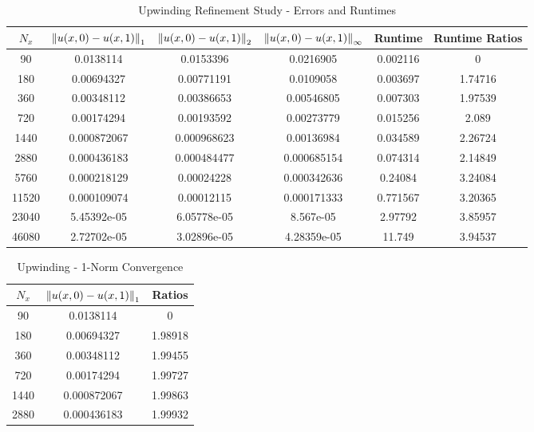 \documentclass[12pt]{article}
\begin{document}
\begin{enumerate}[(a)]
\begin{table}[H]
\caption{Upwinding Refinement Study - Errors and Runtimes}
\centering\begin{tabular}{||c|ccc|cc||}
\hline \hline
    $N_x$ & $\norm{u(x,0)-u(x,1)}_1$ & $\norm{u(x,0)-u(x,1)}_2$ & $\norm{u(x,0)-u(x,1)}_{\infty}$ &   Runtime &   Runtime Ratios \\
\hline
    90 &    0.0138114   &    0.0153396   &      0.0216905   &  0.002116 &          0       \\
   180 &    0.00694327  &    0.00771191  &      0.0109058   &  0.003697 &          1.74716 \\
   360 &    0.00348112  &    0.00386653  &      0.00546805  &  0.007303 &          1.97539 \\
   720 &    0.00174294  &    0.00193592  &      0.00273779  &  0.015256 &          2.089   \\
  1440 &    0.000872067 &    0.000968623 &      0.00136984  &  0.034589 &          2.26724 \\
  2880 &    0.000436183 &    0.000484477 &      0.000685154 &  0.074314 &          2.14849 \\
  5760 &    0.000218129 &    0.00024228  &      0.000342636 &  0.24084  &          3.24084 \\
 11520 &    0.000109074 &    0.00012115  &      0.000171333 &  0.771567 &          3.20365 \\
 23040 &    5.45392e-05 &    6.05778e-05 &      8.567e-05   &  2.97792  &          3.85957 \\
 46080 &    2.72702e-05 &    3.02896e-05 &      4.28359e-05 & 11.749    &          3.94537 \\
\hline \hline
\end{tabular}
\end{table}
\begin{minipage}{0.5\textwidth}
\begin{table}[H]
\caption{Upwinding - 1-Norm Convergence}
\centering\begin{tabular}{||c|cc||}
\hline \hline
    $N_x$ &   $\norm{u(x,0)-u(x,1)}_1$ &   Ratios \\
\hline
    90 &    0.0138114   &  0       \\
   180 &    0.00694327  &  1.98918 \\
   360 &    0.00348112  &  1.99455 \\
   720 &    0.00174294  &  1.99727 \\
  1440 &    0.000872067 &  1.99863 \\
  2880 &    0.000436183 &  1.99932 \\

\end{tabular}
\end{table}
\end{minipage}
\end{enumerate}
\end{document}

